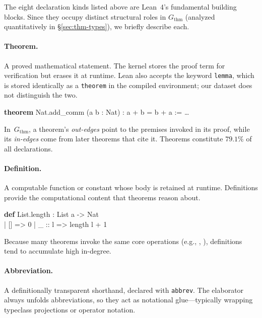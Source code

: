 The eight declaration kinds listed above are Lean~4's fundamental building blocks. Since they occupy distinct structural roles in $G_{\mathrm{thm}}$ (analyzed quantitatively in \S\ref{sec:thm-types}), we briefly describe each.

\paragraph{Theorem.}
A proved mathematical statement. The kernel stores the proof term for verification but erases it at runtime. Lean also accepts the keyword \texttt{lemma}, which is stored identically as a \texttt{theorem} in the compiled environment; our dataset does not distinguish the two.

\begin{codebox}
\textbf{theorem} \textcolor{red!70!black}{Nat.add\_comm} (a b : Nat) : a + b = b + a := \ldots
\end{codebox}

\noindent
In~$G_{\mathrm{thm}}$, a theorem's \emph{out-edges} point to the premises invoked in its proof, while its \emph{in-edges} come from later theorems that cite it. Theorems constitute $79.1\%$ of all declarations.

\paragraph{Definition.}
A computable function or constant whose body is retained at runtime. Definitions provide the computational content that theorems reason about.

\begin{codebox}
\textbf{def} \textcolor{red!70!black}{List.length} : List a -> Nat\\
\hspace{1.5em}| [] => 0 | \_ :: l => length l + 1
\end{codebox}

\noindent
Because many theorems invoke the same core operations (e.g., , ), definitions tend to accumulate high in-degree.

\paragraph{Abbreviation.}
A definitionally transparent shorthand, declared with \texttt{abbrev}. The elaborator always unfolds abbreviations, so they act as notational glue---typically wrapping typeclass projections or operator notation.

